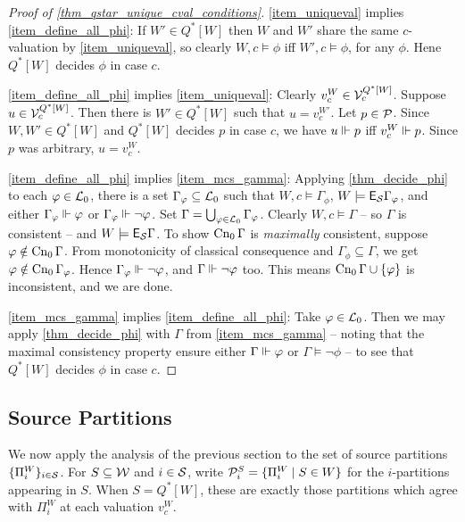 \begin{proof}[Proof of \cref{thm_qstar_unique_cval_conditions}]
    \cref{item_uniqueval} implies \cref{item_define_all_phi}: If $W' \in
    Q^*[W]$ then $W$ and $W'$ share the same $c$-valuation by
    \cref{item_uniqueval}, so clearly $W, c \models \phi$ iff $W', c \models
    \phi$, for any $\phi$. Hene $Q^*[W]$ decides $\phi$ in case $c$.

    \cref{item_define_all_phi} implies \cref{item_uniqueval}: Clearly $v^W_c
    \in \mathcal{V}^{Q^*[W]}_c$. Suppose $u \in \mathcal{V}^{Q^*[W]}_c$. Then there is $W'
    \in Q^*[W]$ such that $u = v^{W'}_c$. Let $p \in \mathcal{P}$. Since $W, W'
    \in Q^*[W]$ and $Q^*[W]$ decides $p$ in case $c$, we have $u \Vdash p$
    iff $v^W_c \Vdash p$. Since $p$ was arbitrary, $u = v^W_c$.

    \cref{item_define_all_phi} implies \cref{item_mcs_gamma}: Applying
    \cref{thm_decide_phi} to each $\varphi \in \mathcal{L}_0$, there is a set
    $\Gamma_\varphi \subseteq \mathcal{L}_0$ such that $W, c \models \Gamma_\phi$, $W
    \models \mathsf{E}_{\mathcal{S}}\Gamma_\varphi$, and either $\Gamma_\varphi \Vdash \varphi$ or
    $\Gamma_\varphi \Vdash \neg\varphi$. Set $\Gamma = \bigcup_{\varphi \in
    \mathcal{L}_0}{\Gamma_\varphi}$. Clearly $W, c \models \Gamma$ -- so $\Gamma$ is
    consistent -- and $W \models \mathsf{E}_{\mathcal{S}}\Gamma$. To show $\operatorname{Cn}_0{\Gamma}$ is
    \emph{maximally} consistent, suppose $\varphi \notin \operatorname{Cn}_0{\Gamma}$. From
    monotonicity of classical consequence and $\Gamma_\phi \subseteq \Gamma$,
    we get $\varphi \notin \operatorname{Cn}_0{\Gamma_\varphi}$. Hence $\Gamma_\varphi \Vdash
    \neg\varphi$, and $\Gamma \Vdash \neg\varphi$ too. This means
    $\operatorname{Cn}_0{\Gamma} \cup \{\varphi\}$ is inconsistent, and we are done.

    \cref{item_mcs_gamma} implies \cref{item_define_all_phi}: Take $\varphi \in
    \mathcal{L}_0$. Then we may apply \cref{thm_decide_phi} with $\Gamma$ from
    \cref{item_mcs_gamma} -- noting that the maximal consistency property
    ensure either $\Gamma \Vdash \varphi$ or $\Gamma \models \neg\phi$ -- to
    see that $Q^*[W]$ decides $\phi$ in case $c$.
\end{proof}

\subsection{Source Partitions}

We now apply the analysis of the previous section to the set of source
partitions $\{\Pi^W_i\}_{i \in \mathcal{S}}$. For $S \subseteq \mathcal{W}$ and $i \in
\mathcal{S}$, write $\mathcal{P}^S_i = \{\Pi^W_i \mid S \in W\}$ for the $i$-partitions
appearing in $S$. When $S = Q^*[W]$, these are exactly those partitions which
agree with $\Pi^W_i$ at each valuation $v^W_c$.

